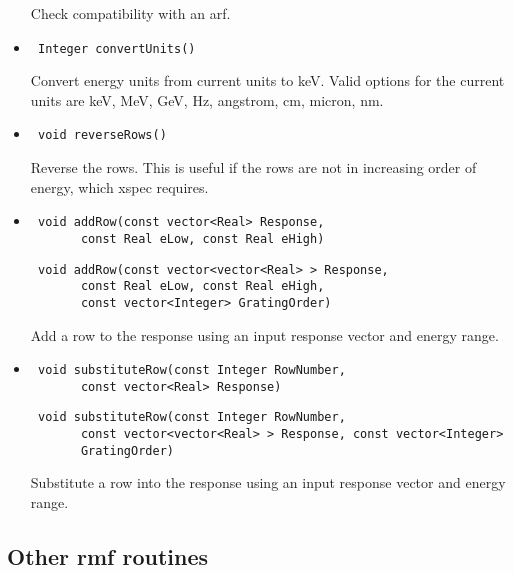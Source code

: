 \documentclass[11pt]{book}
\begin{document}
\begin{itemize}
          Check compatibility with an arf.

\item  \begin{verbatim} Integer convertUnits() \end{verbatim}

          Convert energy units from current units to keV. Valid
          options for the current units are keV, MeV, GeV, Hz,
          angstrom, cm, micron, nm.

\item  \begin{verbatim} void reverseRows() \end{verbatim}  

          Reverse the rows. This is useful if the rows are not in
          increasing order of energy, which xspec requires.

\item  \begin{verbatim} void addRow(const vector<Real> Response, 
       const Real eLow, const Real eHigh) \end{verbatim}
       \begin{verbatim} void addRow(const vector<vector<Real> > Response, 
       const Real eLow, const Real eHigh, 
       const vector<Integer> GratingOrder) \end{verbatim}

          Add a row to the response using an input response vector and energy range.

\item  \begin{verbatim} void substituteRow(const Integer RowNumber, 
       const vector<Real> Response) \end{verbatim}
       \begin{verbatim} void substituteRow(const Integer RowNumber, 
       const vector<vector<Real> > Response, const vector<Integer>
       GratingOrder) \end{verbatim}

          Substitute a row into the response using an input response 
          vector and energy range.


\end{itemize}

\subsection{Other rmf routines}
\end{document}
